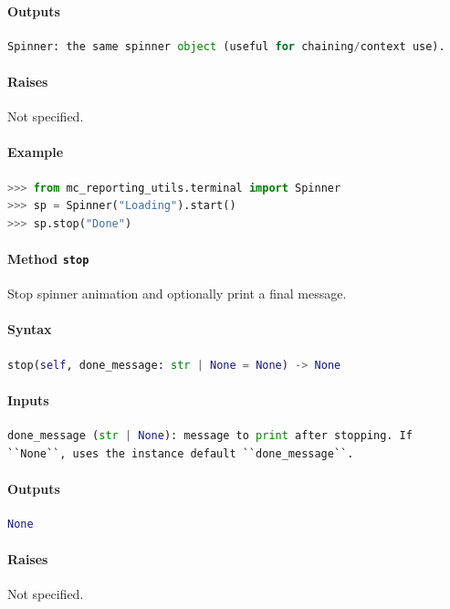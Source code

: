 \documentclass[11pt]{article}
\begin{document}
\paragraph{Outputs}
\begin{lstlisting}[language=Python]
Spinner: the same spinner object (useful for chaining/context use).
\end{lstlisting}
\paragraph{Raises}
Not specified.
\paragraph{Example}
\begin{lstlisting}[language=Python]
>>> from mc_reporting_utils.terminal import Spinner
>>> sp = Spinner("Loading").start()
>>> sp.stop("Done")
\end{lstlisting}

\paragraph{Method \texttt{stop}}
Stop spinner animation and optionally print a final message.

\paragraph{Syntax}
\begin{lstlisting}[language=Python]
stop(self, done_message: str | None = None) -> None
\end{lstlisting}
\paragraph{Inputs}
\begin{lstlisting}[language=Python]
done_message (str | None): message to print after stopping. If
``None``, uses the instance default ``done_message``.
\end{lstlisting}
\paragraph{Outputs}
\begin{lstlisting}[language=Python]
None
\end{lstlisting}
\paragraph{Raises}
Not specified.
\end{document}
